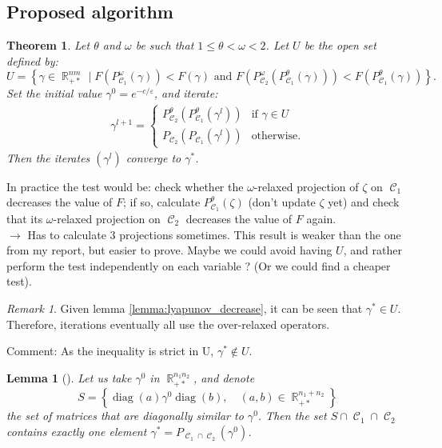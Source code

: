 \documentclass{article} %
\DeclareMathOperator{\IR}{\mathbb{R}}
\DeclareMathOperator{\Ccal}{\mathcal{C}}
\DeclareMathOperator{\diag}{diag}
\renewcommand{\epsilon}{\varepsilon}
\theoremstyle{plain}
\newtheorem{theorem}{Theorem}
\newtheorem{lemma}{Lemma}
\theoremstyle{definition}
\theoremstyle{remark}
\newtheorem{remark}{Remark}
\begin{document}
\subsection{Proposed algorithm}


\begin{theorem}\label{thm:algo}
	Let $\theta$ and $\omega$ be such that $1\le \theta < \omega < 2$. Let $U$ be the open set defined by:
	\begin{equation}\label{eq:open_set_U}
	U = \left\{
	\gamma \in \IR_{+*}^{nm} \mid
	F(P^\omega_{\Ccal_1}(\gamma)) < F(\gamma)
	\text{ and }
	F(P^\omega_{\Ccal_2}(P^\theta_{\Ccal_1}(\gamma))) < F(P^\theta_{\Ccal_1}(\gamma))
	\right\}.
	\end{equation}
	Set the initial value $\gamma^0 = e^{-c/\epsilon}$, and iterate:
	\begin{align*}
	\gamma^{l+1} =
	\begin{cases}
	P^\theta_{\Ccal_2}(P^\theta_{\Ccal_1}(\gamma^l)) & \text{if } \gamma \in U \\
	P_{\Ccal_2}(P_{\Ccal_1}(\gamma^l)) & \text{otherwise.}
	\end{cases}
	\end{align*}
	Then the iterates $(\gamma^l)$ converge to $\gamma^*$.
\end{theorem}
{\color{red} 
	In practice the test would be: check whether the $\omega$-relaxed projection of $\zeta$ on $\Ccal_1$ decreases the value of
	$F$; if so, calculate $P_{\Ccal_1}^\theta(\zeta)$ (don't update $\zeta$ yet) and check that its $\omega$-relaxed projection on $\Ccal_2$ decreases the value of $F$ again. \\
	$\longrightarrow$ Has to calculate 3 projections sometimes. This result is weaker than the one from my report, but easier to prove. Maybe we could avoid having $U$, and rather perform the test independently on each variable ? (Or we could find a cheaper test).}
\begin{remark}
	Given lemma \ref{lemma:lyapunov_decrease}, it can be seen that $\gamma^* \in U$. Therefore, iterations eventually all use the over-relaxed operators.
	
	
\end{remark}
{\color{blue} Comment: As the inequality is strict in U, $\gamma^*\notin U$.} 


\begin{lemma}[\cite{cuturi13}]
	\label{lemma:trivial_intersection}
	Let us take $\gamma^0$ in $\IR_{+*}^{n_1 n_2}$,
	and denote
	\[
	S = \left\{
	\diag(a) \gamma^0 \diag(b),\quad
	(a,b) \in \IR_{+*}^{n_1 + n_2}
	\right\}
	\]
	the set of matrices that are diagonally similar to $\gamma^0$.
	Then the set $S \cap \Ccal_1 \cap \Ccal_2$ contains exactly one element $\gamma^* = P_{\Ccal_1 \cap \Ccal_2}(\gamma^0)$.
\end{lemma}
\end{document}
